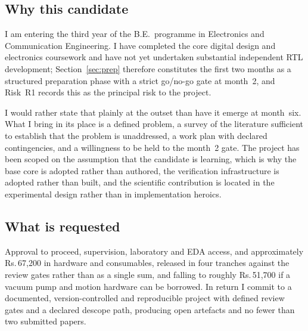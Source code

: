 \documentclass[11pt,a4paper]{article}
\newcommand{\rupee}{\textrm{Rs.}}
\begin{document}
\subsection{Why this candidate}

I am entering the third year of the B.E.\ programme in Electronics and
Communication Engineering. I have completed the core digital design and
electronics coursework and have not yet undertaken substantial independent RTL
development; Section~\ref{sec:prep} therefore constitutes the first two months
as a structured preparation phase with a strict go/no-go gate at month~2, and
Risk~R1 records this as the principal risk to the project.

I would rather state that plainly at the outset than have it emerge at month~six.
What I bring in its place is a defined problem, a survey of the literature
sufficient to establish that the problem is unaddressed, a work plan with
declared contingencies, and a willingness to be held to the month~2 gate. The
project has been scoped on the assumption that the candidate is learning, which
is why the base core is adopted rather than authored, the verification
infrastructure is adopted rather than built, and the scientific contribution is
located in the experimental design rather than in implementation heroics.

\subsection{What is requested}

Approval to proceed, supervision, laboratory and EDA access, and approximately
\rupee\,67{,}200 in hardware and consumables, released in four tranches against
the review gates rather than as a single sum, and falling to roughly
\rupee\,51{,}700 if a vacuum pump and motion hardware can be borrowed. In return I commit to a documented,
version-controlled and reproducible project with defined review gates and a
declared descope path, producing open artefacts and no fewer than two submitted
papers.



\end{document}

